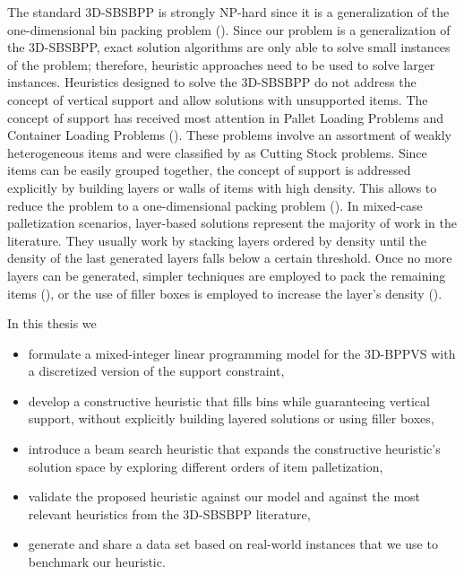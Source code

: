 The standard 3D-SBSBPP is strongly NP-hard since it is a generalization of the one-dimensional bin packing problem (\cite{martello2000three}).
Since our problem is a generalization of the 3D-SBSBPP, exact solution algorithms are only able to solve small instances of the problem; therefore, heuristic approaches need to be used to solve larger instances.
Heuristics designed to solve the 3D-SBSBPP do not address the concept of vertical support and allow solutions with unsupported items.
The concept of support has received most attention in Pallet Loading Problems and Container Loading Problems (\cite{Calzavara2021, kurpel2020exact}).
These problems involve an assortment of weakly heterogeneous items and were classified by \cite{WASCHER20071109} as Cutting Stock problems.
Since items can be easily grouped together, the concept of support is addressed explicitly by building layers or walls of items with high density. This allows to reduce the problem to a one-dimensional packing problem (\cite{BORTFELDT20131}).
In mixed-case palletization scenarios, layer-based solutions represent the majority of work in the literature. They usually work by stacking layers ordered by density until the density of the last generated layers falls below a certain threshold.
Once no more layers can be generated, simpler techniques are employed to pack the remaining items (\cite{elhedhli2019three}), or the use of filler boxes is employed to increase the layer's density (\cite{Calzavara2021}).

In this thesis we
\begin{itemize}
    \item formulate a mixed-integer linear programming model for the 3D-BPPVS with a discretized version of the support constraint,
    \item develop a constructive heuristic that fills bins while guaranteeing vertical support, without explicitly building layered solutions or using filler boxes,
    \item introduce a beam search heuristic that expands the constructive heuristic's solution space by exploring different orders of item palletization,
    \item validate the proposed heuristic against our model and against the most relevant heuristics from the 3D-SBSBPP literature,
    \item generate and share a data set based on real-world instances that we use to benchmark our heuristic.
\end{itemize}

\newpage
